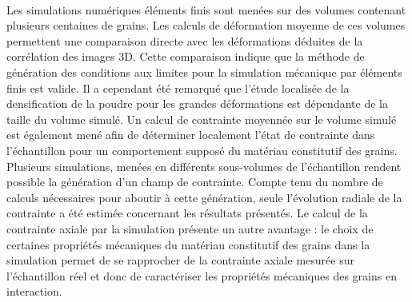 \paragraph{}
Les simulations numériques éléments finis sont menées sur des volumes contenant plusieurs centaines de grains. Les calculs de déformation moyenne de ces volumes permettent une comparaison directe avec les déformations déduites de la corrélation des images 3D. Cette comparaison indique que la méthode de génération des conditions aux limites pour la simulation mécanique par éléments finis est valide. Il a cependant été remarqué que l’étude localisée de la densification de la poudre pour les grandes déformations est dépendante de la taille du volume simulé. Un calcul de contrainte moyennée sur le volume simulé est également mené afin de déterminer localement l’état de contrainte dans l’échantillon pour un comportement supposé du matériau constitutif des grains. Plusieurs simulations, menées en différents sous-volumes de l’échantillon  rendent possible la génération d’un champ de contrainte. Compte tenu du nombre de calculs nécessaires pour aboutir à cette génération, seule l’évolution radiale de la contrainte a été estimée concernant les résultats présentés. Le calcul de la contrainte axiale par la simulation présente un autre avantage : le choix de certaines propriétés mécaniques du matériau constitutif des grains dans la simulation permet de se rapprocher de la contrainte axiale mesurée sur l’échantillon réel et donc de caractériser les propriétés mécaniques des grains en interaction.